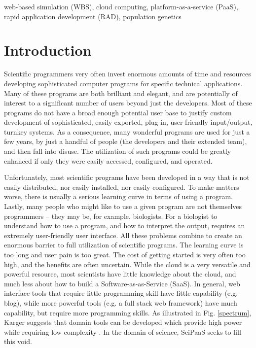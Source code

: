 \documentclass[10pt,reprint]{socc14}
\begin{document}


\keywords
web-based simulation (WBS), cloud computing, platform-as-a-service (PaaS), rapid application development (RAD), population genetics

\section{Introduction}

Scientific programmers very often invest enormous amounts of time and resources developing sophisticated computer programs for specific technical applications. Many of these programs are both brilliant and elegant, and are potentially of interest to a significant number of users beyond just the developers. Most of these programs do not have a broad enough potential user base to justify custom development of sophisticated, easily exported, plug-in, user-friendly input/output, turnkey systems.  As a consequence, many wonderful programs are used for just a few years, by just a handful of people (the developers and their extended team), and then fall into disuse. The utilization of such programs could be greatly enhanced if only they were easily accessed, configured, and operated.

Unfortunately, most scientific programs have been developed in a way that is not easily distributed, nor easily installed, nor easily configured. To make matters worse, there is usually a serious learning curve in terms of using a program. Lastly, many people who might like to use a given program are not themselves programmers – they may be, for example, biologists.  For a biologist to understand how to use a program, and how to interpret the output, requires an extremely user-friendly user interface.  All these problems combine to create an enormous barrier to full utilization of scientific programs. The learning curve is too long and user pain is too great. The cost of getting started is very often too high, and the benefits are often uncertain. 
While the cloud is a very versatile and powerful resource, most scientists have little knowledge about the cloud, and much less about how to build a Software-as-as-Service (SaaS). In general, web interface tools that require little programming skill have little capability (e.g. blog), while more powerful tools (e.g. a full stack web framework) have much capability, but require more programming skills. As illustrated in Fig. \ref{spectrum}, Karger suggests that domain tools can be developed which provide high power while requiring low complexity \cite{karger14}. In the domain of science, SciPaaS seeks to fill this void.
\end{document}
